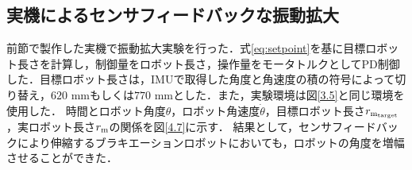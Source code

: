 \subsection{実機によるセンサフィードバックな振動拡大}
前節で製作した実機で振動拡大実験を行った．式\ref{eq:setpoint}を基に目標ロボット長さを計算し，制御量をロボット長さ，操作量をモータトルクとしてPD制御した．目標ロボット長さは，IMUで取得した角度と角速度の積の符号によって切り替え，$620$ mmもしくは$770$ mmとした．また，実験環境は図\ref{3.5}と同じ環境を使用した．
時間とロボット角度$\theta$，ロボット角速度$\dot{\theta
}$，目標ロボット長さ$r_{\rm{m_{target}}}$，実ロボット長さ$r_{\rm{m}}$の関係を図\ref{4.7}に示す．
結果として，センサフィードバックにより伸縮するブラキエーションロボットにおいても，ロボットの角度を増幅させることができた．
